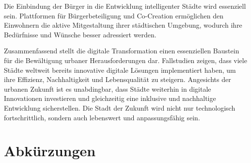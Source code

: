 \documentclass[conference,compsoc,final,a4paper, onecolumn, 11pt]{IEEEtran}
\begin{document}
Die Einbindung der Bürger in die Entwicklung intelligenter Städte wird essenziell sein. 
Plattformen für Bürgerbeteiligung und Co-Creation ermöglichen den Einwohnern die aktive Mitgestaltung ihrer städtischen Umgebung, wodurch ihre Bedürfnisse und Wünsche besser adressiert werden.

Zusammenfassend stellt die digitale Transformation einen essenziellen Baustein für die Bewältigung urbaner Herausforderungen dar. 
Fallstudien zeigen, dass viele Städte weltweit bereits innovative digitale Lösungen implementiert haben, um ihre Effizienz, Nachhaltigkeit und Lebensqualität zu steigern. 
Angesichts der urbanen Zukunft ist es unabdingbar, dass Städte weiterhin in digitale Innovationen investieren und gleichzeitig eine inklusive und nachhaltige Entwicklung sicherstellen. 
Die Stadt der Zukunft wird nicht nur technologisch fortschrittlich, sondern auch lebenswert und anpassungsfähig sein.


\section*{Abkürzungen}

\begin{acronym}[IEEE]
\end{acronym}

\printbibliography
\end{document}
